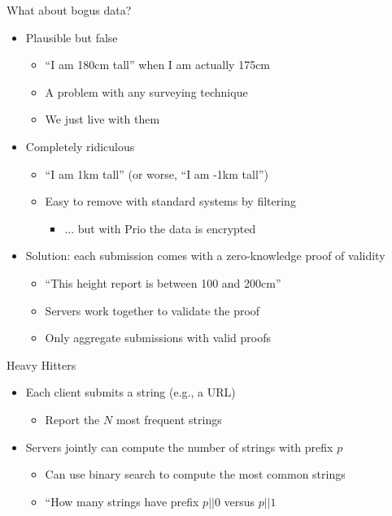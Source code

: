 \documentclass[helvetica]{beamer}
\begin{document}
\begin{frame}{What about bogus data?}

  \begin{itemize}
  \item Plausible but false
    \begin{itemize}
    \item ``I am 180cm tall'' when I am actually 175cm
    \item A problem with any surveying technique
    \item We just live with them
    \end{itemize}
  \item Completely ridiculous
    \begin{itemize}
    \item ``I am 1km tall'' (or worse, ``I am -1km tall'')
    \item Easy to remove with standard systems by filtering
      \begin{itemize}
      \item ... but with Prio the data is encrypted
      \end{itemize}

    \end{itemize}
  \item Solution: each submission comes with a zero-knowledge proof of validity
    \begin{itemize}
    \item ``This height report is between 100 and 200cm''
    \item Servers work together to validate the proof
    \item Only aggregate submissions with valid proofs
    \end{itemize}
  \end{itemize}
\end{frame}


\begin{frame}{Heavy Hitters~\cite{cryptoeprint:2021:017}}

  \begin{itemize}
  \item Each client submits a string (e.g., a URL)
    \begin{itemize}
    \item Report the $N$ most frequent strings
    \end{itemize}

  \item Servers jointly can compute the number of strings with prefix $p$
    \begin{itemize}
    \item Can use binary search to compute the most common strings
    \item ``How many strings have prefix $p || 0$ versus $p || 1$
    \end{itemize}
  \end{itemize}

\end{frame}
\end{document}
